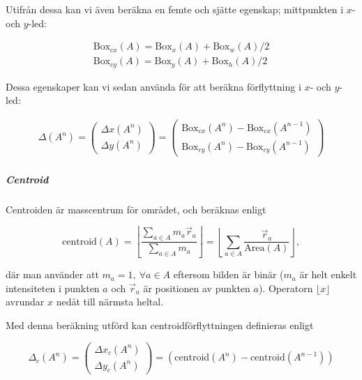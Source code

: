 \documentclass[../rapport_MVEX01-11-05]{subfiles}
\begin{document}
Utifrån dessa kan vi även beräkna en femte och sjätte egenskap;
mittpunkten i $x$- och $y$-led:

\begin{gather*}
  \textrm{Box}_{cx}(A) = \textrm{Box}_x(A) + \textrm{Box}_w(A)/2\\
  \textrm{Box}_{cy}(A) = \textrm{Box}_y(A) + \textrm{Box}_h(A)/2
\end{gather*}

Dessa egenskaper kan vi sedan använda för att beräkna förflyttning i
$x$- och $y$-led:

\begin{gather*}
  \Delta (A^n) =
  \begin{pmatrix}
    \Delta x(A^n)\\[3pt]
    \Delta y(A^n)
  \end{pmatrix}
  =
  \begin{pmatrix}
    \textrm{Box}_{cx}(A^n) - \textrm{Box}_{cx}(A^{n-1})\\[3pt]
    \textrm{Box}_{cy}(A^n) - \textrm{Box}_{cy}(A^{n-1})
  \end{pmatrix}
\end{gather*}

\subparagraph{Centroid}

Centroiden är masscentrum för området, och beräknas enligt

\begin{equation*}
  \textrm{centroid}(A) = \left\lfloor\frac{
    \sum\limits_{a\in A}m_a\vec{r}_a
  }{
    \sum\limits_{a\in A}m_a
  }\right\rfloor =
  \left\lfloor\sum\limits_{a\in
  A}\frac{\vec{r}_a}{\textrm{Area}(A)}\right\rfloor,
\end{equation*}

där man använder att $m_a=1,\:\forall a\in A$ eftersom bilden är
binär ($m_a$ är helt enkelt intensiteten i punkten $a$ och
$\vec{r}_a$ är positionen av punkten $a$). Operatorn $\lfloor
x\rfloor$ avrundar $x$ nedåt till närmsta heltal.

Med denna beräkning utförd kan centroidförflyttningen definieras enligt

\begin{equation*}
  \Delta_c(A^n) = 
  \begin{pmatrix}
    \Delta x_c(A^n) \\[3pt]
    \Delta y_c(A^n)
   \end{pmatrix}
   = \left(\textrm{centroid}(A^n)-\textrm{centroid}(A^{n-1})\right)
\end{equation*}
\end{document}
